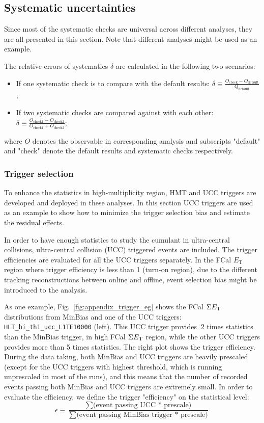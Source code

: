 \subsection{Systematic uncertainties}

Since most of the systematic checks are universal across different analyses, they are all presented in this section. Note that different analyses might be used as an example.

The relative errors of systematics $\delta$ are calculated in the following two scenarios:
\begin{itemize}
\item If one systematic check is to compare with the default results: $\delta \equiv \frac{O_\text{check}-O_\text{default}}{Q_\text{default}}$;
\item If two systematic checks are compared against with each other: $\delta \equiv \frac{O_\text{check1}-O_\text{check2}}{O_\text{check1}+O_\text{check2}}$;
\end{itemize}
where $O$ denotes the observable in corresponding analysis and subscripts "default" and "check" denote the default results and systematic checks respectively.



\subsubsection{Trigger selection}
\label{sec:trigger_selection_bias}

To enhance the statistics in high-multiplicity region, HMT and UCC triggers are developed and deployed in these analyses. In this section UCC triggers are used as an example to show how to minimize the trigger selection bias and estimate the residual effects.

In order to have enough statistics to study the cumulant in ultra-central collisions, ultra-central collision (UCC) triggered events are included. The trigger efficiencies are evaluated for all the UCC triggers separately. In the FCal $E_\text{T}$ region where trigger efficiency is less than 1 (turn-on region), due to the different tracking reconstructions between online and offline, event selection bias might be introduced to the analysis.

As one example, Fig.~\ref{fig:appendix_trigger_eg} shows the FCal $\Sigma E_\text{T}$ distributions from MinBias and one of the UCC triggers: \verb|HLT_hi_|\verb|th1_ucc_L1TE10000| (left). This UCC trigger provides $~2$ times statistics than the MinBias trigger, in high FCal $\Sigma E_\text{T}$ region, while the other UCC triggers provides more than 5 times statistics. The right plot shows the trigger efficiency. During the data taking, both MinBias and UCC triggers are heavily prescaled (except for the UCC triggers with highest threshold, which is running unprescaled in most of the runs), and this means that the number of recorded events passing both MinBias and UCC triggers are extremely small. In order to evaluate the efficiency, we define the trigger "efficiency" on the statistical level:
\begin{equation}
\epsilon\equiv \frac{\sum\text{(event passing UCC * prescale)}}{\sum\text{(event passing MinBias trigger * prescale)}}
\end{equation}


